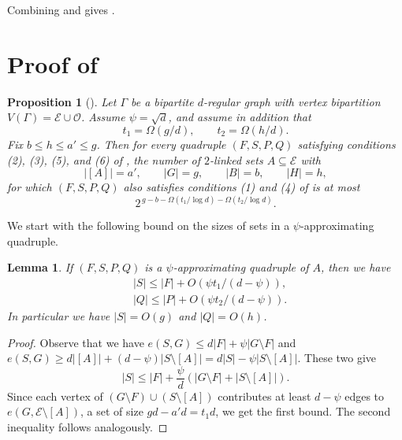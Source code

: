\documentclass{amsart}
\newtheorem*{prop*}{Proposition}
\newtheorem{lem}[thm]{Lemma}
\theoremstyle{definition}
\newcommand{\cO}{\mathcal{O} }
\newcommand{\cE}{\mathcal{E} }
\newcommand{\0}[0]{\emptyset}
\begin{document}
Combining  and  gives .


\section{Proof of }\label{app:reconstruction}\label{app:3}

\begin{prop*}[]
Let $\Gamma$ be a bipartite $d$-regular graph with vertex bipartition $V(\Gamma)=\cE\cup \cO$.
Assume $\psi=\sqrt d$, and assume in addition that
\[
t_1=\Omega(g/d),
\qquad
t_2=\Omega(h/d).
\]
Fix $b\le h\le a'\le g$. Then for every quadruple $(F,S,P,Q)$ satisfying conditions (2), (3), (5), and (6) of , the number of $2$-linked sets $A\subseteq \cE$ with
\[
|[A]|=a',
\qquad
|G|=g,
\qquad
|B|=b,
\qquad
|H|=h,
\]
for which $(F,S,P,Q)$ also satisfies conditions (1) and (4) of  is at most
\[
2^{\,g-b- \Omega(t_1/\log d)- \Omega(t_2/\log d)}.
\]
\end{prop*}

We start with the following bound on the sizes of sets in a $\psi$-approximating quadruple.

\begin{lem}\label{lem:S-bound}
    If $(F,S,P,Q)$ is a $\psi$-approximating quadruple of $A$, then we have
    \begin{align*}
        &|S|\leq |F|+O(\psi t_1 /(d-\psi)),\\
        &|Q|\leq |P|+O(\psi t_2 /(d-\psi)).
    \end{align*}
    In particular we have $|S|=O(g)$ and $|Q|=O(h)$.
\end{lem}
\begin{proof}
Observe that we have $e(S,G)\leq d|F|+\psi|G\setminus F|$ and $e(S,G)\geq d|[A]|+(d-\psi)|S\setminus [A]|=d|S|-\psi|S \setminus [A]|$. These two give
\[
|S|\leq |F|+\frac{\psi}{d}(|G\setminus F|+|S\setminus [A]|).
\]
Since each vertex of $(G\setminus F)\cup (S\setminus [A])$ contributes at least $d-\psi$ edges to $e(G, \cE\setminus [A])$, a set of size $gd-a'd=t_1d$, we get the first bound. The second inequality follows analogously.
\end{proof}
\end{document}

